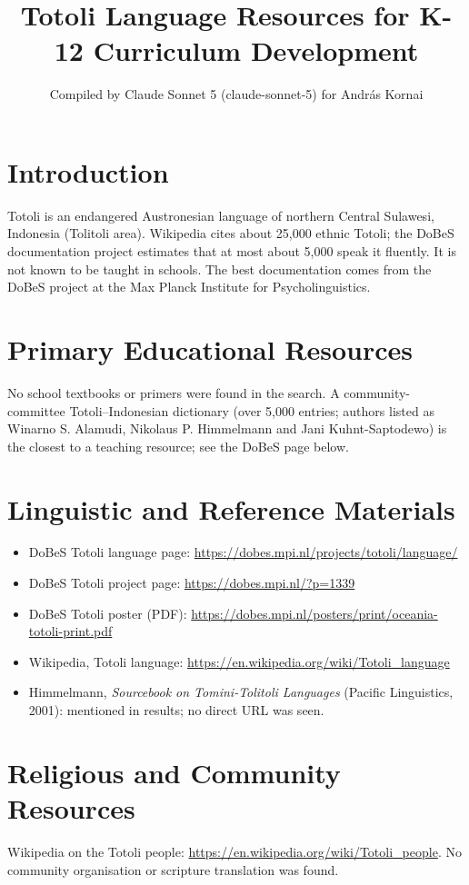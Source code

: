 \documentclass[12pt]{article}
\title{Totoli Language Resources for K-12 Curriculum Development}
\author{Compiled by Claude Sonnet 5 (claude-sonnet-5) for Andr\'as Kornai}
\date{}
\begin{document}
\maketitle

\section{Introduction}
Totoli is an endangered Austronesian language of northern Central Sulawesi, Indonesia (Tolitoli area). Wikipedia cites about 25,000 ethnic Totoli; the DoBeS documentation project estimates that at most about 5,000 speak it fluently. It is not known to be taught in schools. The best documentation comes from the DoBeS project at the Max Planck Institute for Psycholinguistics.

\section{Primary Educational Resources}
No school textbooks or primers were found in the search. A community-committee Totoli--Indonesian dictionary (over 5,000 entries; authors listed as Winarno S. Alamudi, Nikolaus P. Himmelmann and Jani Kuhnt-Saptodewo) is the closest to a teaching resource; see the DoBeS page below.

\section{Linguistic and Reference Materials}
\begin{itemize}
\item DoBeS Totoli language page: \url{https://dobes.mpi.nl/projects/totoli/language/}
\item DoBeS Totoli project page: \url{https://dobes.mpi.nl/?p=1339}
\item DoBeS Totoli poster (PDF): \url{https://dobes.mpi.nl/posters/print/oceania-totoli-print.pdf}
\item Wikipedia, Totoli language: \url{https://en.wikipedia.org/wiki/Totoli_language}
\item Himmelmann, \emph{Sourcebook on Tomini-Tolitoli Languages} (Pacific Linguistics, 2001): mentioned in results; no direct URL was seen.
\end{itemize}

\section{Religious and Community Resources}
Wikipedia on the Totoli people: \url{https://en.wikipedia.org/wiki/Totoli_people}. No community organisation or scripture translation was found.
\end{document}
